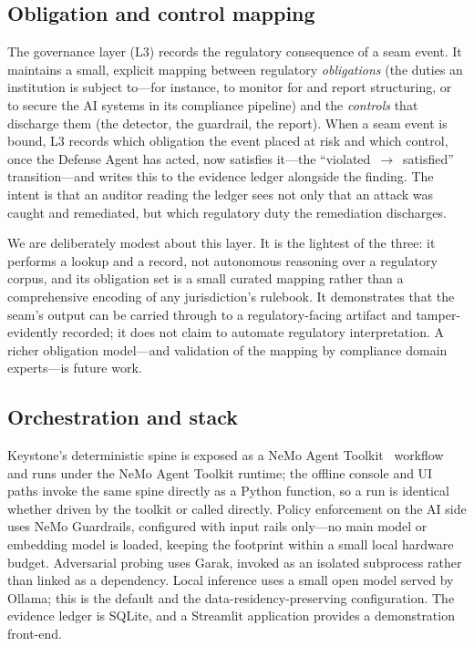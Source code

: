 \documentclass[10pt,twocolumn]{article}
\begin{document}
\subsection{Obligation and control mapping}

The governance layer (L3) records the regulatory consequence of a seam event. It
maintains a small, explicit mapping between regulatory \emph{obligations} (the
duties an institution is subject to---for instance, to monitor for and report
structuring, or to secure the AI systems in its compliance pipeline) and the
\emph{controls} that discharge them (the detector, the guardrail, the
report). When a seam event is bound, L3 records which obligation the event
placed at risk and which control, once the Defense Agent has acted, now
satisfies it---the ``violated~$\rightarrow$~satisfied'' transition---and writes
this to the evidence ledger alongside the finding. The intent is that an auditor
reading the ledger sees not only that an attack was caught and remediated, but
which regulatory duty the remediation discharges.

We are deliberately modest about this layer. It is the lightest of the three: it
performs a lookup and a record, not autonomous reasoning over a regulatory
corpus, and its obligation set is a small curated mapping rather than a
comprehensive encoding of any jurisdiction's rulebook. It demonstrates that the
seam's output can be carried through to a regulatory-facing artifact and
tamper-evidently recorded; it does not claim to automate regulatory
interpretation. A richer obligation model---and validation of the mapping by
compliance domain experts---is future work.

\subsection{Orchestration and stack}

Keystone's deterministic spine is exposed as a NeMo Agent
Toolkit~\cite{nat} workflow and runs under the NeMo Agent Toolkit runtime; the
offline console and UI paths invoke the same spine directly as a Python
function, so a run is identical whether driven by the toolkit or called
directly. Policy enforcement on the AI side uses NeMo Guardrails, configured with
input rails only---no main model or embedding model is loaded, keeping the
footprint within a small local hardware budget. Adversarial probing uses Garak,
invoked as an isolated subprocess rather than linked as a dependency. Local
inference uses a small open model served by Ollama; this is the default and the
data-residency-preserving configuration. The evidence ledger is SQLite, and a
Streamlit application provides a demonstration front-end.
\end{document}
